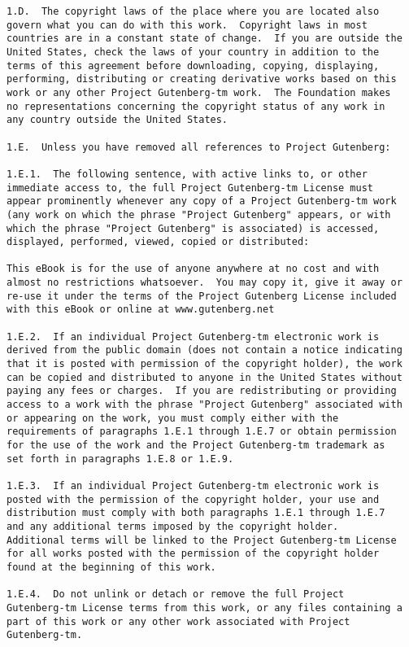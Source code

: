 \documentclass[letterpaper,12pt,oneside,openany]{memoir}
\begin{document}
\begin{verbatim}
1.D.  The copyright laws of the place where you are located also
govern what you can do with this work.  Copyright laws in most
countries are in a constant state of change.  If you are outside the
United States, check the laws of your country in addition to the
terms of this agreement before downloading, copying, displaying,
performing, distributing or creating derivative works based on this
work or any other Project Gutenberg-tm work.  The Foundation makes
no representations concerning the copyright status of any work in
any country outside the United States.

1.E.  Unless you have removed all references to Project Gutenberg:

1.E.1.  The following sentence, with active links to, or other
immediate access to, the full Project Gutenberg-tm License must
appear prominently whenever any copy of a Project Gutenberg-tm work
(any work on which the phrase "Project Gutenberg" appears, or with
which the phrase "Project Gutenberg" is associated) is accessed,
displayed, performed, viewed, copied or distributed:

This eBook is for the use of anyone anywhere at no cost and with
almost no restrictions whatsoever.  You may copy it, give it away or
re-use it under the terms of the Project Gutenberg License included
with this eBook or online at www.gutenberg.net

1.E.2.  If an individual Project Gutenberg-tm electronic work is
derived from the public domain (does not contain a notice indicating
that it is posted with permission of the copyright holder), the work
can be copied and distributed to anyone in the United States without
paying any fees or charges.  If you are redistributing or providing
access to a work with the phrase "Project Gutenberg" associated with
or appearing on the work, you must comply either with the
requirements of paragraphs 1.E.1 through 1.E.7 or obtain permission
for the use of the work and the Project Gutenberg-tm trademark as
set forth in paragraphs 1.E.8 or 1.E.9.

1.E.3.  If an individual Project Gutenberg-tm electronic work is
posted with the permission of the copyright holder, your use and
distribution must comply with both paragraphs 1.E.1 through 1.E.7
and any additional terms imposed by the copyright holder.
Additional terms will be linked to the Project Gutenberg-tm License
for all works posted with the permission of the copyright holder
found at the beginning of this work.

1.E.4.  Do not unlink or detach or remove the full Project
Gutenberg-tm License terms from this work, or any files containing a
part of this work or any other work associated with Project
Gutenberg-tm.


\end{verbatim}
\end{document}
